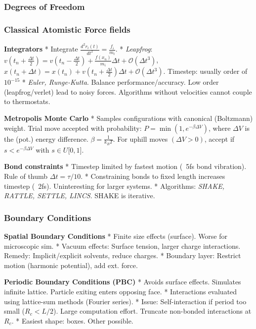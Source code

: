 \documentclass{article}
\begin{document}
\subsubsection{Degrees of Freedom}\label{degrees-of-freedom}    

\subsubsection{Classical Atomistic Force fields}\label{classical-atomistic-force-fields}   

     

\textbf{Integrators} * Integrate \(\frac{d^{2}r_{i}(t)}{dt^{2}} = \frac{f_{i}}{m_{i}}\). * \textit{Leapfrog}: \(v\left( t_{n} + \frac{\Delta t}{2} \right) = v\left( t_{n} - \frac{\Delta t}{2} \right) + \frac{f\left( x_{n} \right)}{m_{i}}\Delta t + \mathcal{O}\left( \Delta t^{3} \right)\), \(x\left( t_{n} + \Delta t \right) = x\left( t_{n} \right) + v\left( t_{n} + \frac{\Delta t}{2} \right)\Delta t + \mathcal{O}\left( \Delta t^{3} \right)\). Timestep: usually order of \(10^{- 15}\) * \textit{Euler, Runge-Kutta}. Balance performance/accuracy. Low order (leapfrog/verlet) lead to noisy forces. Algorithms without velocities cannot couple to thermostats.

\textbf{Metropolis Monte Carlo} * Samples configurations with canonical (Boltzmann) weight. Trial move accepted with probability: \(P = \min(1,e^{- \beta\Delta V})\), where \(\Delta V\) is the (pot.) energy difference. \(\beta = \frac{1}{k_{B}T}\). For uphill moves \((\Delta V > 0)\), accept if \(s < e^{- \beta\Delta V}\) with \(s \in U\lbrack 0,1\rbrack\).

\textbf{Bond constraints} * Timestep limited by fastest motion (~5fs bond vibration). Rule of thumb \(\Delta t = \tau/10\). * Constraining bonds to fixed length increases timestep (~2fs). Uninteresting for larger systems. * Algorithms: \textit{SHAKE, RATTLE, SETTLE, LINCS}. SHAKE is iterative.

\subsubsection{Boundary Conditions}\label{boundary-conditions}  \textbf{Spatial Boundary Conditions} * Finite size effects (surface). Worse for microscopic sim. * Vacuum effects: Surface tension, larger charge interactions. Remedy: Implicit/explicit solvents, reduce charges. * Boundary layer: Restrict motion (harmonic potential), add ext. force.

\textbf{Periodic Boundary Conditions (PBC)} * Avoids surface effects. Simulates infinite lattice. Particle exiting enters opposing face. * Interactions evaluated using lattice-sum methods (Fourier series). * Issue: Self-interaction if period too small (\(R_{c} < L/2\)). Large computation effort. Truncate non-bonded interactions at \(R_{c}\). * Easiest shape: boxes. Other possible.
\end{document}
